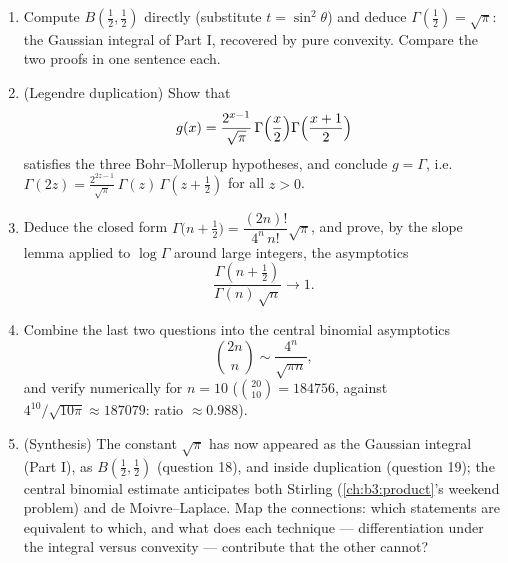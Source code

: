 \begin{problem}
\begin{enumerate}[resume]
        integrals anywhere.
  \item Compute $B(\frac12, \frac12)$ directly (substitute $t
        = \sin^2\theta$) and deduce $\Gamma(\frac12) =
        \sqrt\pi$: the Gaussian integral of Part I, recovered
        by pure convexity. Compare the two proofs in one
        sentence each.
  \item (Legendre duplication) Show that
        \[
        g(x) = \frac{2^{x-1}}{\sqrt\pi}\,
        \Gamma\Bigl(\frac x2\Bigr)
        \Gamma\Bigl(\frac{x+1}2\Bigr)
        \]
        satisfies the three Bohr--Mollerup hypotheses, and
        conclude $g = \Gamma$, i.e.\ $\Gamma(2z) =
        \frac{2^{2z-1}}{\sqrt\pi}\,\Gamma(z)\,\Gamma(z +
        \tfrac12)$ for all $z > 0$.
  \item Deduce the closed form $\Gamma\bigl(n + \tfrac12\bigr)
        = \dfrac{(2n)!}{4^n\,n!}\sqrt\pi$, and prove, by the
        slope lemma applied to $\log\Gamma$ around large
        integers, the asymptotics
        \[
        \frac{\Gamma(n + \frac12)}{\Gamma(n)\,\sqrt n}
        \longrightarrow 1 .
        \]
  \item Combine the last two questions into the central
        binomial asymptotics
        \[
        \binom{2n}{n} \sim \frac{4^n}{\sqrt{\pi n}},
        \]
        and verify numerically for $n = 10$ ($\binom{20}{10} =
        184756$, against $4^{10}/\sqrt{10\pi} \approx
        187079$: ratio $\approx 0.988$).
  \item (Synthesis) The constant $\sqrt\pi$ has now appeared as
        the Gaussian integral (Part I), as $B(\frac12,
        \frac12)$ (question 18), and inside duplication
        (question 19); the central binomial estimate
        anticipates both Stirling (\cref{ch:b3:product}'s
        weekend problem) and de Moivre--Laplace. Map the
        connections: which statements are equivalent to which,
        and what does each technique --- differentiation under
        the integral versus convexity --- contribute that the
        other cannot?
\end{enumerate}


\end{problem}
